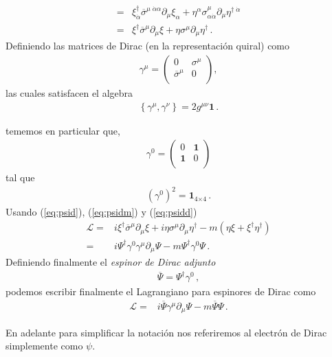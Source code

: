 \begin{frame}
\begin{align}
=&\xi^{\dagger}_{\dot{\alpha}}\overline{\sigma}^{\mu\;\dot{\alpha}\alpha}\partial_{\mu}\xi_{\alpha}+\eta^{\alpha}\sigma^{\mu}_{\alpha\dot{\alpha}}\partial_{\mu}\eta^{\dagger\;\dot{\alpha}}\nonumber\\
=&\xi^{\dagger}\overline{\sigma}^{\mu}\partial_{\mu}\xi+\eta\sigma^{\mu}\partial_{\mu}\eta^{\dagger}\,.
\end{align}
Definiendo las matrices de Dirac (en la representación quiral) como
\begin{align}
  \gamma^\mu= \begin{pmatrix}
    0           &\sigma^{\mu}\\
    \overline{\sigma}^{\mu} &0\\
  \end{pmatrix},
\end{align}
las cuales satisfacen el algebra
\begin{align}
  \left\{ \gamma^{\mu},\gamma^{\nu} \right\}=2 g^{\mu\nu}\mathbf{1}\,.
\end{align}

tememos en particular que, 
\begin{align}
  \gamma^0= \begin{pmatrix}
    0           &\mathbf{1}\\
    \mathbf{1} &0\\
  \end{pmatrix}
\end{align}
tal que
\begin{align}
  \left( \gamma^{0} \right)^2=\mathbf{1}_{\text{4$\times 4$}}\,.
\end{align}
Usando (\ref{eq:psid}), (\ref{eq:psidm}) y (\ref{eq:psidd})
\begin{align}
  \mathcal{L}=&i\xi^{\dagger}\overline{\sigma}^{\mu}\partial_{\mu}\xi+i\eta\sigma^{\mu}\partial_{\mu}\eta^{\dagger}
-m \left(\eta\xi+\xi^{\dagger}\eta^{\dagger} \right)\nonumber\\
=&i\Psi^{\dagger}\gamma^{0}\gamma^{\mu}\partial_{\mu}\Psi-m\Psi^{\dagger}\gamma^{0}\Psi\,.
\end{align}
Definiendo finalmente el \emph{espinor de Dirac adjunto}
\begin{align}
  \overline{\Psi}=\Psi^{\dagger}\gamma^{0}\,,
\end{align}
podemos escribir finalmente el Lagrangiano para espinores de Dirac  como
\begin{align}
\label{eq:115qftnew}
  \mathcal{L}=&i\overline{\Psi}\gamma^{\mu}\partial_{\mu}\Psi-m\overline{\Psi}\Psi\,.
\end{align}
\end{frame}
En adelante para simplificar la notación nos referiremos al electrón de Dirac simplemente como $\psi$.

